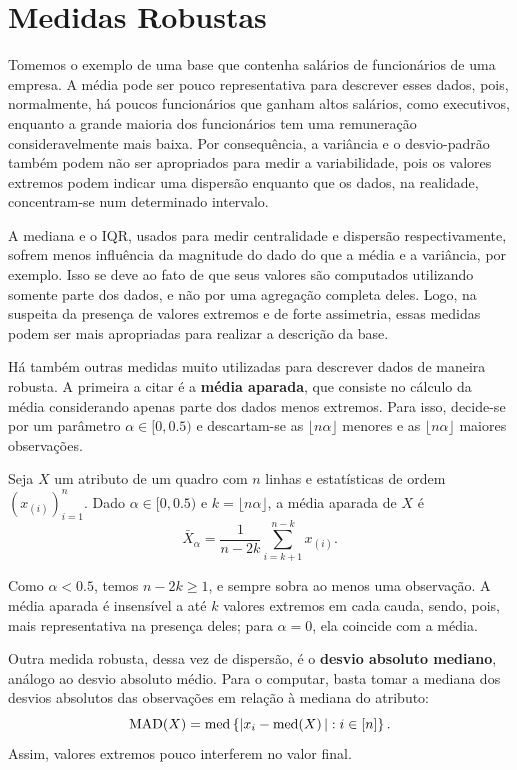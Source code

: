 \section{Medidas Robustas}

Tomemos o exemplo de uma base que contenha salários de funcionários de uma empresa.
A média pode ser pouco representativa para descrever esses dados, pois, normalmente, há
poucos funcionários que ganham altos salários, como executivos, enquanto a grande maioria
dos funcionários tem uma remuneração consideravelmente mais baixa.
Por consequência, a variância e o desvio-padrão também podem não ser apropriados para
medir a variabilidade, pois os valores extremos podem indicar uma dispersão enquanto que
os dados, na realidade, concentram-se num determinado intervalo.

A mediana e o IQR, usados para medir centralidade e dispersão respectivamente, sofrem
menos influência da magnitude do dado do que a média e a variância, por exemplo.
Isso se deve ao fato de que seus valores são computados utilizando somente parte
dos dados, e não por uma agregação completa deles.
Logo, na suspeita da presença de valores extremos e de forte assimetria, essas medidas
podem ser mais apropriadas para realizar a descrição da base.

Há também outras medidas muito utilizadas para descrever dados de maneira robusta.
A primeira a citar é a \textbf{média aparada}, que consiste no cálculo da média
considerando apenas parte dos dados menos extremos.
Para isso, decide-se por um parâmetro $\alpha \in [0, 0.5)$ e descartam-se as
$\lfloor n\alpha \rfloor$ menores e as $\lfloor n\alpha \rfloor$ maiores observações.
\begin{def:media aparada}
Seja $X$ um atributo de um quadro com $n$ linhas e estatísticas de ordem
$(x_{(i)})_{i=1}^n$.
Dado $\alpha \in [0, 0.5)$ e $k = \lfloor n\alpha \rfloor$, a média aparada de $X$ é
\[
    \bar X_\alpha = \frac{1}{n - 2k} \sum_{i=k+1}^{n-k} x_{(i)}.
\]
\end{def:media aparada}
Como $\alpha < 0.5$, temos $n - 2k \ge 1$, e sempre sobra ao menos uma observação.
A média aparada é insensível a até $k$ valores extremos em cada cauda, sendo, pois, mais
representativa na presença deles; para $\alpha = 0$, ela coincide com a média.

Outra medida robusta, dessa vez de dispersão, é o \textbf{desvio absoluto mediano},
análogo ao desvio absoluto médio.
Para o computar, basta tomar a mediana dos desvios absolutos das observações em relação à
mediana do atributo:
\[
    \mathrm{MAD}(X) = \mathrm{med}\left\{ |x_i - \mathrm{med}\!\left(X\right)| : i \in [n] \right\}.
\]
Assim, valores extremos pouco interferem no valor final.
